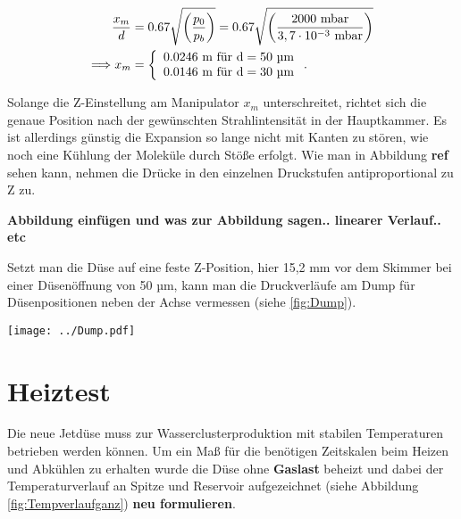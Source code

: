 \begin{equation}
   \begin{split}
   \frac{x_m}{d} & =0.67 \sqrt{\left(\frac{p_0}{p_b}\right)} = 0.67 \sqrt{\left(\frac{2000 \ \textmd{mbar}}{3,7 \cdot 10^{-3}\ \textmd{mbar}}\right)}\\ 
   \Longrightarrow x_m  & =  
   \left\{ %
   \begin{array}{l}
   0.0246\ \textmd{m} \textmd{ für d}= 50 \textmd{ µm} \\ 
   0.0146\ \textmd{m} \textmd{ für d}= 30 \textmd{ µm}
   \end{array}
   \right. .
   \end{split}
\end{equation}

Solange die Z-Einstellung am Manipulator $x_m$ unterschreitet, richtet sich die genaue Position nach der gewünschten Strahlintensität in der Hauptkammer. Es ist allerdings günstig die Expansion so lange nicht mit Kanten zu stören, wie noch eine Kühlung der Moleküle durch Stöße erfolgt. Wie man in Abbildung \textbf{ref} sehen kann, nehmen die Drücke in den einzelnen Druckstufen antiproportional zu Z zu. 

\textbf{Abbildung einfügen und was zur Abbildung sagen.. linearer Verlauf.. etc}

Setzt man die Düse auf eine feste Z-Position, hier 15,2 mm vor dem Skimmer bei einer Düsenöffnung von 50 µm, kann man die Druckverläufe am Dump für Düsenpositionen neben der Achse vermessen (siehe \ref{fig:Dump}).

\begin{center}
\begin{minipage}{\linewidth}
\centering
\texttt{[image: ../Dump.pdf]}%
 \label{fig:Dump}
\end{minipage} 
\end{center} 



\section{Heiztest}

Die neue Jetdüse muss zur Wasserclusterproduktion mit stabilen Temperaturen betrieben werden können. Um ein Maß für die benötigen Zeitskalen beim Heizen und Abkühlen zu erhalten wurde die Düse ohne \textbf{Gaslast} beheizt und dabei der Temperaturverlauf an Spitze und Reservoir aufgezeichnet (siehe Abbildung \ref{fig:Tempverlaufganz}) \textbf{neu formulieren}. 

